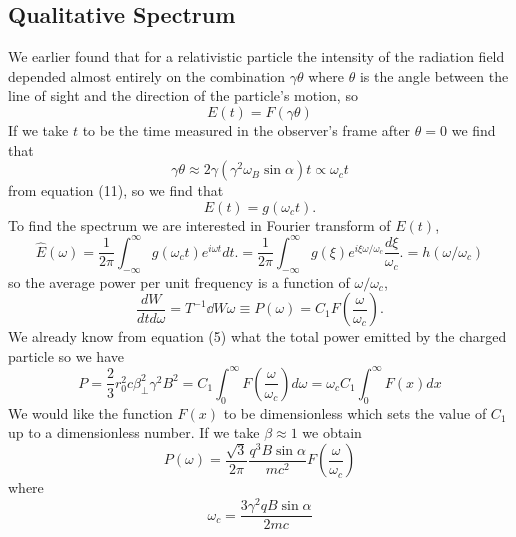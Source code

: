 \subsection{Qualitative Spectrum}
\label{sec:qualitative-spectrum}

We earlier found that for a relativistic particle the intensity of the
radiation field depended almost entirely on the combination 
$\gamma\theta$ where $\theta$ is the angle between the line of sight
and the direction of the particle's motion, so
\begin{equation}
E(t) = F(\gamma \theta)
\label{eq:372}
\end{equation}
If we take $t$ to be the
time measured in the observer's frame after $\theta=0$ we find that
\begin{equation}
\gamma\theta \approx 2 \gamma \left ( \gamma^2 \omega_B \sin \alpha
\right) t \propto \omega_c t
\label{eq:373}
\end{equation}
from equation (11), so we find that
\begin{equation}
E(t) = g(\omega_c t).
\label{eq:374}
\end{equation}
To find the spectrum we are interested in Fourier transform of $E(t)$,
\begin{equation}
{\hat E}(\omega) = \frac{1}{2\pi} \int_{-\infty}^\infty
g(\omega_c t) e^{i\omega t} dt. = \frac{1}{2\pi}  \int_{-\infty}^\infty
g(\xi) e^{i\xi \omega/\omega_c} \frac{d\xi}{\omega_c}. = h(\omega/\omega_c)
\label{eq:375}
\end{equation}
so the average power per unit frequency is a function of
$\omega/\omega_c$,
\begin{equation}
\frac{dW}{dtd\omega} = T^{-1} \dd{W}{\omega} \equiv P(\omega) = 
C_1 F\left(\frac{\omega}{\omega_c}\right).
\label{eq:376}
\end{equation}
We already know from equation (5) what the total power emitted by the 
charged particle so we have
\begin{equation}
P = \frac{2}{3} r_0^2 c \beta^2_\perp \gamma^2 B^2 = C_1 \int_0^\infty
F\left(\frac{\omega}{\omega_c}\right) d\omega =  \omega_c C_1 \int_0^\infty
F(x) dx
\label{eq:377}
\end{equation}
We would like the function $F(x)$ to be dimensionless which sets the
value of $C_1$ up to a dimensionless number.  If we take $\beta\approx
1$ we obtain
\begin{equation}
P(\omega) = \frac{\sqrt{3}}{2\pi} \frac{q^3 B \sin\alpha}{mc^2} F\left(\frac{\omega}{\omega_c}\right) 
\label{eq:378}
\end{equation}
where
\begin{equation}
\omega_c = \frac{3\gamma^2 q B \sin\alpha}{2mc}
\label{eq:379}
\end{equation}
